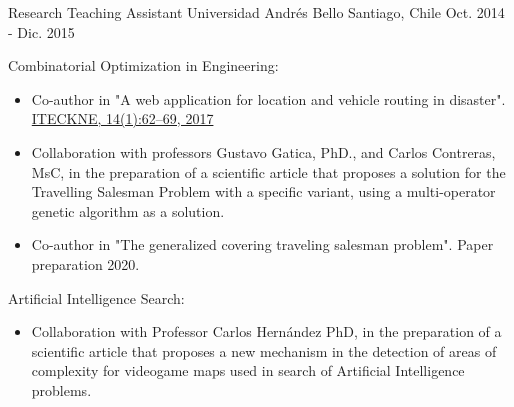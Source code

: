 
\begin{cventries}

  \cventry
    {Research Teaching Assistant} %
    {Universidad Andrés Bello} %
    {Santiago, Chile} %
    {Oct. 2014 - Dic. 2015} %
    {
      \begin{cvitems} %
      	\item {Combinatorial Optimization in Engineering:}
      		\begin{itemize}
      			\item {Co-author in "A web application for location and vehicle routing in disaster". \href{http://revistas.ustabuca.edu.co/index.php/ITECKNE/article/view/1631}{ITECKNE, 14(1):62–69, 2017}}
      			\item {Collaboration with professors Gustavo Gatica, PhD., and Carlos Contreras, MsC, in the preparation of a scientific article that proposes a solution for the Travelling Salesman Problem with a specific variant, using a multi-operator genetic algorithm as a solution.}
      			\item {Co-author in "The generalized covering traveling salesman problem". Paper preparation 2020.}
      		\end{itemize}
      	\item {Artificial Intelligence Search:}
      	\begin{itemize}
      		\item {Collaboration with Professor Carlos Hernández PhD, in the preparation of a scientific article that proposes a new mechanism in the detection of areas of complexity for videogame maps used in search of Artificial Intelligence problems.}
      	\end{itemize}
      \end{cvitems}
    }
\end{cventries}

